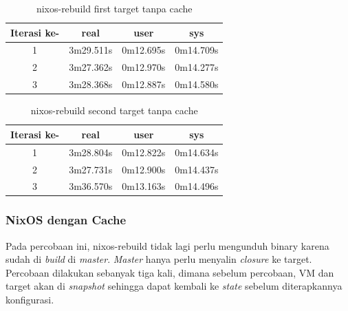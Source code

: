 \documentclass[10pt,]{report}
\begin{document}
\begin{adjustwidth}{20pt}{}
\begin{adjustwidth}{20pt}{}
	\end{adjustwidth}
	\begin{table}[H]
		\caption{nixos-rebuild first target tanpa cache}
		\begin{center}
			\begin{tabular}[c]{|c|c|c|c|}
				\hline
				\multicolumn{1}{|c|}{\textbf{Iterasi ke-}} &
				\multicolumn{1}{c|}{\textbf{real}}         &
				\multicolumn{1}{c|}{\textbf{user}}         &
				\multicolumn{1}{c|}{\textbf{sys}}                                              \\
				\hline
				1                                          & 3m29.511s & 0m12.695s & 0m14.709s \\
				\hline
				2                                          & 3m27.362s & 0m12.970s & 0m14.277s \\
				\hline
				3                                          & 3m28.368s & 0m12.887s & 0m14.580s \\
				\hline
			\end{tabular}
		\end{center}
	\end{table}
	\vspace{-5mm}
	\begin{table}[H]
		\caption{nixos-rebuild second target tanpa cache}
		\begin{center}
			\begin{tabular}[c]{|c|c|c|c|}
				\hline
				\multicolumn{1}{|c|}{\textbf{Iterasi ke-}} &
				\multicolumn{1}{c|}{\textbf{real}}         &
				\multicolumn{1}{c|}{\textbf{user}}         &
				\multicolumn{1}{c|}{\textbf{sys}}                                              \\
				\hline
				1                                          & 3m28.804s & 0m12.822s & 0m14.634s \\
				\hline
				2                                          & 3m27.731s & 0m12.900s & 0m14.437s \\
				\hline
				3                                          & 3m36.570s & 0m13.163s & 0m14.496s \\
				\hline
			\end{tabular}
		\end{center}
	\end{table}
	\subsubsection{NixOS dengan Cache}
	\begin{adjustwidth}{20pt}{}
		\hspace\parindent Pada percobaan ini, nixos-rebuild tidak lagi perlu mengunduh binary karena sudah
		di \textit{build} di \textit{master}. \textit{Master} hanya perlu menyalin \textit{closure}
		ke target. Percobaan dilakukan sebanyak tiga kali, dimana sebelum percobaan, VM
		dan target akan di \textit{snapshot} sehingga dapat kembali ke \textit{state}
		sebelum diterapkannya konfigurasi.


\end{adjustwidth}
\end{adjustwidth}
\end{document}
